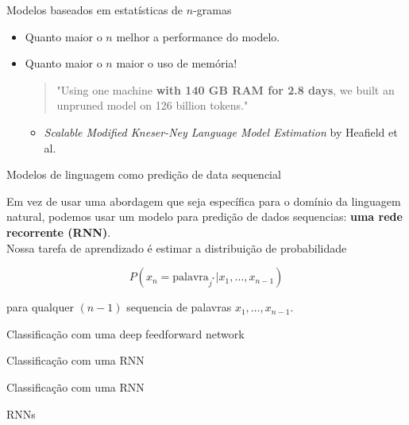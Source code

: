 \documentclass[10pt]{beamer}
\begin{document}
\begin{frame}{Modelos baseados em estatísticas de $n$-gramas}
\begin{itemize}
\item Quanto maior o $n$ melhor a performance do modelo.
\vspace{0.7cm}
\item Quanto maior o $n$ maior o uso de memória!
\vspace{0.1cm}
\begin{quote}
"Using one machine \textbf{with 140 GB
RAM for 2.8 days}, we built an unpruned
model on 126 billion tokens."
\end{quote}
\begin{itemize}
\item [] \textit{Scalable Modified Kneser-Ney Language Model Estimation} by Heafield et al.
\end{itemize}
\end{itemize}
\end{frame}


\begin{frame}{Modelos de linguagem como predição de data sequencial}

Em vez de usar uma abordagem que seja específica para o domínio da linguagem natural, podemos usar um modelo para predição de dados sequencias:  \textbf{uma rede recorrente (RNN)}. \\

Nossa tarefa de aprendizado é estimar a distribuição de probabilidade

\[
P(x_{n} = \text{palavra}_{j^{*}} | x_{1}, \dots ,x_{n-1})
\]

para qualquer $(n-1)$ sequencia de palavras $x_{1}, \dots ,x_{n-1}$.
\end{frame}

\begin{frame}{Classificação com uma deep feedforward network}

\end{frame}

\begin{frame}{Classificação com uma RNN}

\end{frame}

\begin{frame}{Classificação com uma RNN}

\end{frame}


\begin{frame}[fragile]{RNNs}

\end{frame}
\end{document}
